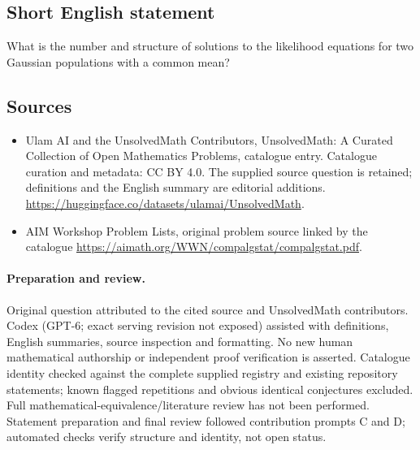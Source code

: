 \documentclass[11pt]{article}
\begin{document}
\subsection{Short English statement}
What is the number and structure of solutions to the likelihood equations for two Gaussian populations with a common mean?
\subsection{Sources}
\begin{itemize}
\item[\hypertarget{source:statement:1}{S1}] Ulam AI and the UnsolvedMath Contributors, UnsolvedMath: A Curated Collection of Open Mathematics Problems, catalogue entry. Catalogue curation and metadata: CC BY 4.0. The supplied source question is retained; definitions and the English summary are editorial additions.
\url{https://huggingface.co/datasets/ulamai/UnsolvedMath}.
\item[\hypertarget{source:statement:2}{S2}] AIM Workshop Problem Lists, original problem source linked by the catalogue
\url{https://aimath.org/WWN/compalgstat/compalgstat.pdf}.
\end{itemize}
\paragraph{Preparation and review.}
Original question attributed to the cited source and UnsolvedMath contributors. Codex (GPT-6; exact serving revision not exposed) assisted with definitions, English summaries, source inspection and formatting. No new human mathematical authorship or independent proof verification is asserted. Catalogue identity checked against the complete supplied registry and existing repository statements; known flagged repetitions and obvious identical conjectures excluded. Full mathematical-equivalence/literature review has not been performed. Statement preparation and final review followed contribution prompts C and D; automated checks verify structure and identity, not open status.
\label{end:statement}
\end{document}
